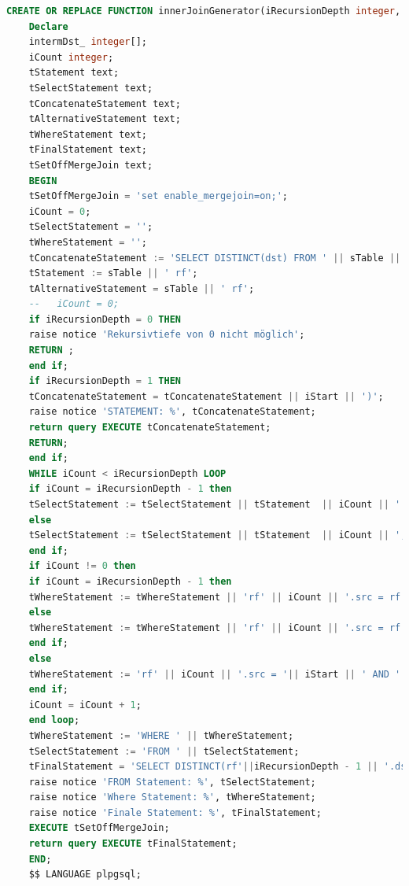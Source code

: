\begin{lstlisting}[language=SQL,caption = innerJoinSourceCodeGenerator,frame=single, label={INNERJOINGENERATOR} ]
    CREATE OR REPLACE FUNCTION innerJoinGenerator(iRecursionDepth integer, sTable text, iStart integer) RETURNS SETOF integer AS $$
    Declare
    intermDst_ integer[];
    iCount integer;
    tStatement text;
    tSelectStatement text;
    tConcatenateStatement text;
    tAlternativeStatement text;
    tWhereStatement text;
    tFinalStatement text;
    tSetOffMergeJoin text;
    BEGIN
    tSetOffMergeJoin = 'set enable_mergejoin=on;';
    iCount = 0;
    tSelectStatement = '';
    tWhereStatement = '';
    tConcatenateStatement := 'SELECT DISTINCT(dst) FROM ' || sTable || ' WHERE src IN(';
    tStatement := sTable || ' rf';
    tAlternativeStatement = sTable || ' rf';
    --   iCount = 0;
    if iRecursionDepth = 0 THEN
    raise notice 'Rekursivtiefe von 0 nicht möglich';
    RETURN ;
    end if;
    if iRecursionDepth = 1 THEN
    tConcatenateStatement = tConcatenateStatement || iStart || ')';
    raise notice 'STATEMENT: %', tConcatenateStatement;
    return query EXECUTE tConcatenateStatement;
    RETURN;
    end if;
    WHILE iCount < iRecursionDepth LOOP
    if iCount = iRecursionDepth - 1 then
    tSelectStatement := tSelectStatement || tStatement  || iCount || ' ';
    else
    tSelectStatement := tSelectStatement || tStatement  || iCount || ', ';
    end if;
    if iCount != 0 then
    if iCount = iRecursionDepth - 1 then
    tWhereStatement := tWhereStatement || 'rf' || iCount || '.src = rf' || iCount - 1 || '.dst ';
    else
    tWhereStatement := tWhereStatement || 'rf' || iCount || '.src = rf' || iCount - 1 || '.dst AND ';
    end if;
    else
    tWhereStatement := 'rf' || iCount || '.src = '|| iStart || ' AND ' ;
    end if;
    iCount = iCount + 1;
    end loop;
    tWhereStatement := 'WHERE ' || tWhereStatement;
    tSelectStatement := 'FROM ' || tSelectStatement;
    tFinalStatement = 'SELECT DISTINCT(rf'||iRecursionDepth - 1 || '.dst) ' || tSelectStatement || tWhereStatement;
    raise notice 'FROM Statement: %', tSelectStatement;
    raise notice 'Where Statement: %', tWhereStatement;
    raise notice 'Finale Statement: %', tFinalStatement;
    EXECUTE tSetOffMergeJoin;
    return query EXECUTE tFinalStatement;
    END;
    $$ LANGUAGE plpgsql;
\end{lstlisting}


